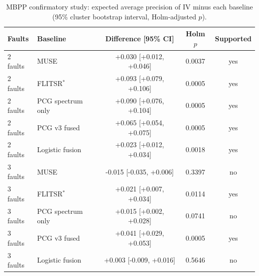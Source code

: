 \begin{table}[t]
\centering
\caption{MBPP confirmatory study: expected average precision of IV minus each baseline (95\% cluster bootstrap interval, Holm-adjusted $p$).}
\label{tab:c1}
\begin{tabular}{llccc}
\toprule
Faults & Baseline & Difference [95\% CI] & Holm $p$ & Supported \\
\midrule
2 faults & MUSE & +0.030 [+0.012, +0.046] & 0.0037 & yes \\
2 faults & FLITSR$^{*}$ & +0.093 [+0.079, +0.106] & 0.0005 & yes \\
2 faults & PCG spectrum only & +0.090 [+0.076, +0.104] & 0.0005 & yes \\
2 faults & PCG v3 fused & +0.065 [+0.054, +0.075] & 0.0005 & yes \\
2 faults & Logistic fusion & +0.023 [+0.012, +0.034] & 0.0018 & yes \\
3 faults & MUSE & -0.015 [-0.035, +0.006] & 0.3397 & no \\
3 faults & FLITSR$^{*}$ & +0.021 [+0.007, +0.034] & 0.0114 & yes \\
3 faults & PCG spectrum only & +0.015 [+0.002, +0.028] & 0.0741 & no \\
3 faults & PCG v3 fused & +0.041 [+0.029, +0.053] & 0.0005 & yes \\
3 faults & Logistic fusion & +0.003 [-0.009, +0.016] & 0.5646 & no \\
\bottomrule
\end{tabular}
\end{table}
